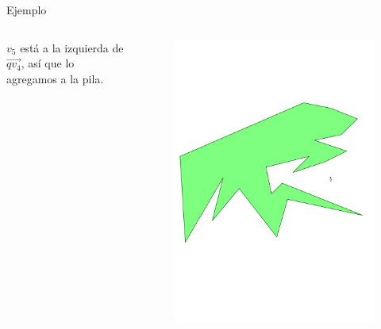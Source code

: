 \documentclass[aspectratio=169,xcolor=dvipsnames, t]{beamer}
\begin{document}
\begin{frame}{Ejemplo}
  \begin{columns}
    \begin{column}{0.3\textwidth}
      \raggedright %
      $v_{5}$ está a la izquierda de $\overrightarrow{qv_{4}}$, así que lo agregamos a la pila.
    \end{column}
    \begin{column}{0.7\textwidth}
      \vspace{-2.5cm} %
      \begin{figure}
        \centering
        \includegraphics[width=1\linewidth, height=.95\textheight, page=17, keepaspectratio]{IPE/point_visibility.pdf}
      \end{figure}
    \end{column}
  \end{columns}
\end{frame}
\end{document}

